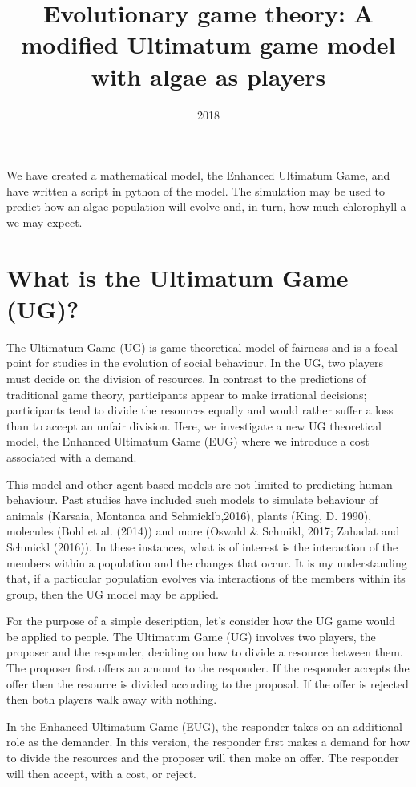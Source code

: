 \documentclass[]{article}
\title{Evolutionary game theory: A modified Ultimatum game model with algae as
players}
\author{}
\date{2018}
\begin{document}
\maketitle

We have created a mathematical model, the Enhanced Ultimatum Game, and
have written a script in python of the model. The simulation may be used
to predict how an algae population will evolve and, in turn, how much
chlorophyll a we may expect.

\section{What is the Ultimatum Game
(UG)?}\label{what-is-the-ultimatum-game-ug}

The Ultimatum Game (UG) is game theoretical model of fairness and is a
focal point for studies in the evolution of social behaviour. In the UG,
two players must decide on the division of resources. In contrast to the
predictions of traditional game theory, participants appear to make
irrational decisions; participants tend to divide the resources equally
and would rather suffer a loss than to accept an unfair division. Here,
we investigate a new UG theoretical model, the Enhanced Ultimatum Game
(EUG) where we introduce a cost associated with a demand.

This model and other agent-based models are not limited to predicting
human behaviour. Past studies have included such models to simulate
behaviour of animals (Karsaia, Montanoa and Schmicklb,2016), plants
(King, D. 1990), molecules (Bohl et al. (2014)) and more (Oswald \&
Schmikl, 2017; Zahadat and Schmickl (2016)). In these instances, what is
of interest is the interaction of the members within a population and
the changes that occur. It is my understanding that, if a particular
population evolves via interactions of the members within its group,
then the UG model may be applied.

For the purpose of a simple description, let's consider how the UG game
would be applied to people. The Ultimatum Game (UG) involves two
players, the proposer and the responder, deciding on how to divide a
resource between them. The proposer first offers an amount to the
responder. If the responder accepts the offer then the resource is
divided according to the proposal. If the offer is rejected then both
players walk away with nothing.

In the Enhanced Ultimatum Game (EUG), the responder takes on an
additional role as the demander. In this version, the responder first
makes a demand for how to divide the resources and the proposer will
then make an offer. The responder will then accept, with a cost, or
reject.
\end{document}
